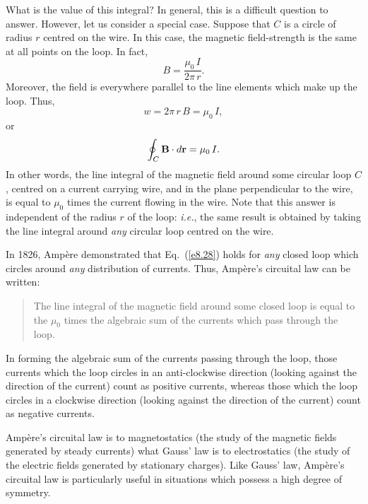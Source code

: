 What is the value of this
 integral? In general, this is a difficult question
to answer. However, let us consider a special case. Suppose that $C$ is a circle
of radius $r$ centred on the wire. In this case, the magnetic field-strength
is the same at all points on the loop. In fact,
\begin{equation}
B  = \frac{\mu_0\,I}{2\pi\,r}.
\end{equation}
Moreover, the field is everywhere parallel to the line elements which
make up the loop. Thus,
\begin{equation}
w = 2\pi\,r\,B = \mu_0\,I,
\end{equation}
or
\begin{equation}\label{e8.28}
\oint_C {\bf B} \cdot d{\bf r} = \mu_0\,I.
\end{equation}
In other words, the line integral of the magnetic field around some
circular loop $C$, centred on a current carrying wire, and
in the plane perpendicular to the wire, is equal to $\mu_0$
times the current flowing in the wire. Note that this answer is independent of
the radius $r$ of the loop: {\em i.e.}, the same result is
obtained by taking the line integral around {\em any}\/ circular loop centred
on the wire.

In 1826, Amp\`{e}re demonstrated that Eq.~(\ref{e8.28}) holds for {\em any}\/ closed loop which
circles around {\em any}\/ distribution of currents. Thus, Amp\`{e}re's circuital law
can be written:
\begin{quote}
{\sf The line integral of the magnetic field around some closed loop
is equal to the $\mu_0$ times the algebraic sum of the currents which pass through the
loop.}
\end{quote}
In forming the algebraic sum of the currents passing through the loop, those currents
 which the loop circles in an anti-clockwise direction (looking
against the direction of the current) count as positive currents, whereas those
 which the loop circles in a clockwise direction (looking
against the direction of the current) count as negative currents. 

Amp\`{e}re's circuital law is to magnetostatics (the study of the magnetic fields
generated by steady currents) what Gauss' law is to electrostatics
(the study of the electric fields generated by stationary charges). Like
Gauss' law, Amp\`{e}re's circuital law is particularly  useful in situations
which possess a high degree of symmetry. 

